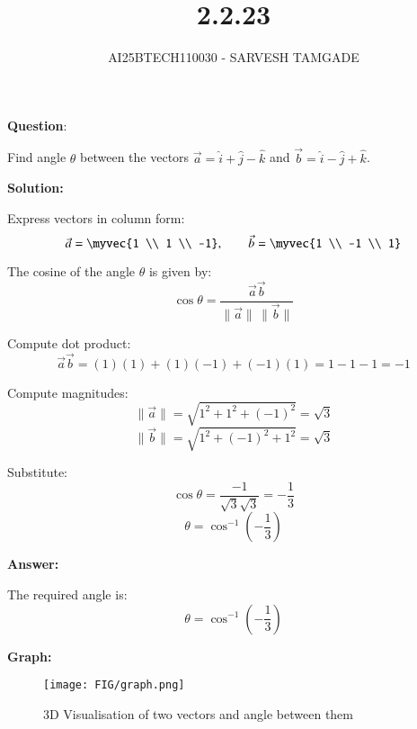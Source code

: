 \documentclass{article}
\title{2.2.23}
\author{AI25BTECH110030 - SARVESH TAMGADE}
\begin{document}
{\let\newpage\relax\maketitle}

\textbf{Question}:

Find angle \(\theta\) between the vectors \(\vec{a} = \hat{i} + \hat{j} - \hat{k}\) and \(\vec{b} = \hat{i} - \hat{j} + \hat{k}\).

\vspace{2mm}
\textbf{Solution:}

Express vectors in column form:
\[
\vec{a} = \myvec{1 \\ 1 \\ -1},
\qquad
\vec{b} = \myvec{1 \\ -1 \\ 1}
\]

The cosine of the angle \(\theta\) is given by:
\[
\cos\theta = \frac{\vec{a}  \vec{b}}{\|\vec{a}\| \, \|\vec{b}\|}
\]

Compute dot product:
\[
\vec{a}  \vec{b} = (1)(1) + (1)(-1) + (-1)(1) = 1 - 1 - 1 = -1
\]

Compute magnitudes:
\[
\|\vec{a}\| = \sqrt{1^2 + 1^2 + (-1)^2} = \sqrt{3}
\]
\[
\|\vec{b}\| = \sqrt{1^2 + (-1)^2 + 1^2} = \sqrt{3}
\]

Substitute:
\[
\cos\theta = \frac{-1}{\sqrt{3}\sqrt{3}} = -\frac{1}{3}
\]
\[
\theta = \cos^{-1}\left(-\frac{1}{3}\right)
\]

\vspace{2mm}
\textbf{Answer:}

The required angle is:
\[
\boxed{\theta = \cos^{-1}\left(-\frac{1}{3}\right)}
\]



\textbf{Graph:}
\begin{figure}[H]
	\centering
	\texttt{[image: FIG/graph.png]}
	\caption{3D Visualisation of two vectors and angle between them}
	\label{img}
\end{figure}
\end{document}
